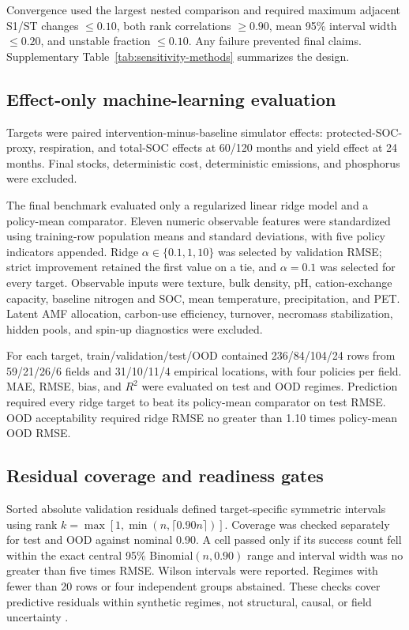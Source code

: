 \documentclass[11pt]{article}
\begin{document}
Convergence used the largest nested comparison and required maximum adjacent S1/ST changes $\leq0.10$, both rank correlations $\geq0.90$, mean 95\% interval width $\leq0.20$, and unstable fraction $\leq0.10$. Any failure prevented final claims. Supplementary Table~\ref{tab:sensitivity-methods} summarizes the design.

\subsection{Effect-only machine-learning evaluation}

Targets were paired intervention-minus-baseline simulator effects: protected-SOC-proxy, respiration, and total-SOC effects at 60/120 months and yield effect at 24 months. Final stocks, deterministic cost, deterministic emissions, and phosphorus were excluded.

The final benchmark evaluated only a regularized linear ridge model and a policy-mean comparator. Eleven numeric observable features were standardized using training-row population means and standard deviations, with five policy indicators appended. Ridge $\alpha\in\{0.1,1,10\}$ was selected by validation RMSE; strict improvement retained the first value on a tie, and $\alpha=0.1$ was selected for every target. Observable inputs were texture, bulk density, pH, cation-exchange capacity, baseline nitrogen and SOC, mean temperature, precipitation, and PET. Latent AMF allocation, carbon-use efficiency, turnover, necromass stabilization, hidden pools, and spin-up diagnostics were excluded.

For each target, train/validation/test/OOD contained 236/84/104/24 rows from 59/21/26/6 fields and 31/10/11/4 empirical locations, with four policies per field. MAE, RMSE, bias, and $R^2$ were evaluated on test and OOD regimes. Prediction required every ridge target to beat its policy-mean comparator on test RMSE. OOD acceptability required ridge RMSE no greater than 1.10 times policy-mean OOD RMSE.

\subsection{Residual coverage and readiness gates}

Sorted absolute validation residuals defined target-specific symmetric intervals using rank $k=\max[1,\min(n,\lceil0.90n\rceil)]$. Coverage was checked separately for test and OOD against nominal 0.90. A cell passed only if its success count fell within the exact central 95\% Binomial$(n,0.90)$ range and interval width was no greater than five times RMSE. Wilson intervals were reported. Regimes with fewer than 20 rows or four independent groups abstained. These checks cover predictive residuals within synthetic regimes, not structural, causal, or field uncertainty \citep{gneiting2007strictly}.
\end{document}
